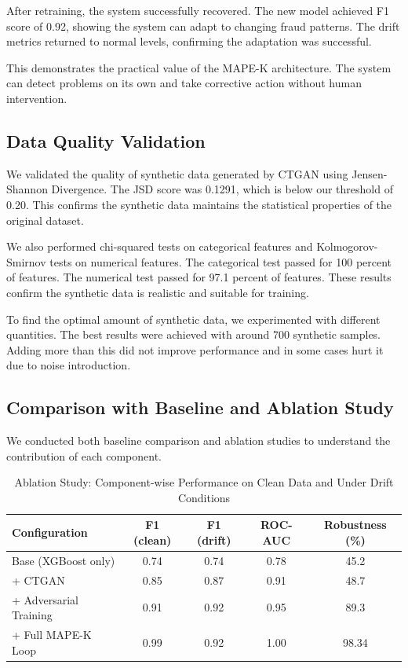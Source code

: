 \documentclass{svproc}
\begin{document}
After retraining, the system successfully recovered. The new model achieved F1 score of 0.92, showing the system can adapt to changing fraud patterns. The drift metrics returned to normal levels, confirming the adaptation was successful.

This demonstrates the practical value of the MAPE-K architecture. The system can detect problems on its own and take corrective action without human intervention.

\subsection{Data Quality Validation}
We validated the quality of synthetic data generated by CTGAN using Jensen-Shannon Divergence. The JSD score was 0.1291, which is below our threshold of 0.20. This confirms the synthetic data maintains the statistical properties of the original dataset.

We also performed chi-squared tests on categorical features and Kolmogorov-Smirnov tests on numerical features. The categorical test passed for 100 percent of features. The numerical test passed for 97.1 percent of features. These results confirm the synthetic data is realistic and suitable for training.

To find the optimal amount of synthetic data, we experimented with different quantities. The best results were achieved with around 700 synthetic samples. Adding more than this did not improve performance and in some cases hurt it due to noise introduction.

\subsection{Comparison with Baseline and Ablation Study}
We conducted both baseline comparison and ablation studies to understand the contribution of each component.

\begin{table}[h]
\centering
\caption{Ablation Study: Component-wise Performance on Clean Data and Under Drift Conditions}
\label{tab:ablation}
\begin{tabular}{|l|c|c|c|c|}
\hline
\textbf{Configuration} & \textbf{F1 (clean)} & \textbf{F1 (drift)} & \textbf{ROC-AUC} & \textbf{Robustness (\%)} \\
\hline
Base (XGBoost only) & 0.74 & 0.74 & 0.78 & 45.2 \\
+ CTGAN & 0.85 & 0.87 & 0.91 & 48.7 \\
+ Adversarial Training & 0.91 & 0.92 & 0.95 & 89.3 \\
+ Full MAPE-K Loop & 0.99 & 0.92 & 1.00 & 98.34 \\
\hline
\end{tabular}
\end{table}
\end{document}
